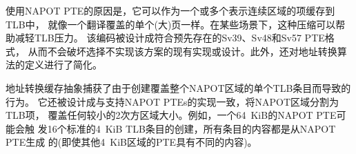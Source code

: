 \begin{commentary}
  使用NAPOT PTE的原因是，它可以作为一个或多个表示连续区域的项缓存到TLB中，
  就像一个翻译覆盖的单个(大)页一样。在某些场景下，这种压缩可以帮助减轻TLB压力。
  该编码被设计成符合预先存在的Sv39、Sv48和Sv57 PTE格式，
  从而不会破坏选择不实现该方案的现有实现或设计。此外，还对地址转换算法的定义进行了简化。

  地址转换缓存抽象捕获了由于创建覆盖整个NAPOT区域的单个TLB条目而导致的行为。
  它还被设计成与支持NAPOT PTEs的实现一致，将NAPOT区域分割为TLB项，
  覆盖任何较小的2次方区域大小。例如，一个64~KiB的NAPOT PTE可能会触
  发16个标准的4~KiB TLB条目的创建，所有条目的内容都是从NAPOT PTE生成
  的(即使其他4~KiB区域的PTE具有不同的内容)。


\end{commentary}
